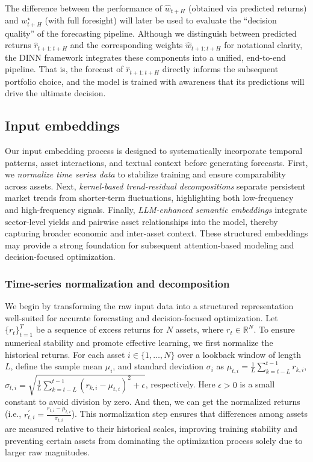 The difference between the performance of $\hat{w}_{t+H}$ (obtained via predicted returns) and $w_{t+H}^{\star}$ (with full foresight) will later be used to evaluate the ``decision quality'' of the forecasting pipeline. Although we distinguish between predicted returns $\hat{r}_{t+1:t+H}$ and the corresponding weights $\hat{w}_{t+1:t+H}$ for notational clarity, the DINN framework integrates these components into a unified, end-to-end pipeline. That is, the forecast of $\hat{r}_{t+1:t+H}$ directly informs the subsequent portfolio choice, and the model is trained with awareness that its predictions will drive the ultimate decision.


\subsection{Input embeddings}
Our input embedding process is designed to systematically incorporate temporal patterns, asset interactions, and textual context before generating forecasts. First, we \emph{normalize time series data} to stabilize training and ensure comparability across assets. Next, \emph{kernel-based trend-residual decompositions} separate persistent market trends from shorter-term fluctuations, highlighting both low-frequency and high-frequency signals. Finally, \emph{LLM-enhanced semantic embeddings} integrate sector-level yields and pairwise asset relationships into the model, thereby capturing broader economic and inter-asset context. These structured embeddings may provide a strong foundation for subsequent attention-based modeling and decision-focused optimization.


\subsubsection{Time-series normalization and decomposition} We begin by transforming the raw input data into a structured representation well-suited for accurate forecasting and decision-focused optimization. Let $\{r_{t}\}_{t=1}^{T}$ be a sequence of excess returns for $N$ assets, where $r_{t} \in \mathbb{R}^{N}$. To ensure numerical stability and promote effective learning, we first normalize the historical returns. For each asset $i \in \{1, \ldots, N \}$ over a lookback window of length $L$, define the sample mean $\mu_i$, and standard deviation $\sigma_i$ as $\mu_{t, i} = \frac{1}{L}\sum_{k=t-L}^{t-1}r_{k,i}$, $\sigma_{t, i} = \sqrt{\frac{1}{L}\sum_{k=t-L}^{t-1}(r_{k,i}-\mu_{t,i})^{2}+\epsilon}$, respectively. Here $\epsilon>0$ is a small constant to avoid division by zero. And then, we can get the normalized returns (i.e., $r_{t,i}^{\prime} = \frac{r_{t,i}-\mu_{t,i}}{\sigma_{t,i}}$). This normalization step\citep{kim2021reversible} ensures that differences among assets are measured relative to their historical scales, improving training stability and preventing certain assets from dominating the optimization process solely due to larger raw magnitudes.

